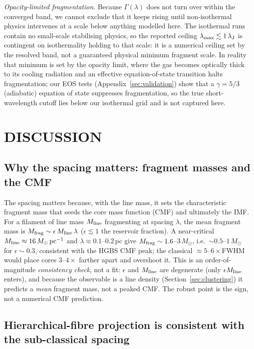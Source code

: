 \documentclass[usenatbib,twoside,twocolumn]{mnras}
\begin{document}
\emph{Opacity-limited fragmentation.} Because $\Gamma(\lambda)$ does not turn over within the converged band, we cannot exclude that it keeps rising until non-isothermal physics intervenes at a scale below anything modelled here. The isothermal runs contain no small-scale stabilising physics, so the reported ceiling $\lambda_{\rm max}\lesssim1\,\lambda_{\rm J}$ is contingent on isothermality holding to that scale: it is a numerical ceiling set by the resolved band, not a guaranteed physical minimum fragment scale. In reality that minimum is set by the opacity limit, where the gas becomes optically thick to its cooling radiation and an effective equation-of-state transition halts fragmentation; our EOS tests (Appendix~\ref{sec:validation}) show that a $\gamma=5/3$ (adiabatic) equation of state suppresses fragmentation, so the true short-wavelength cutoff lies below our isothermal grid and is not captured here.

\section{DISCUSSION}
\label{sec:discussion}

\subsection{Why the spacing matters: fragment masses and the CMF}
\label{sec:cmf}
The spacing matters because, with the line mass, it sets the characteristic fragment mass that seeds the core mass function (CMF) and ultimately the IMF. For a filament of line mass $M_{\rm line}$ fragmenting at spacing $\lambda$, the mean fragment mass is $M_{\rm frag}\sim\epsilon\,M_{\rm line}\,\lambda$ ($\epsilon\lesssim1$ the reservoir fraction). A near-critical $M_{\rm line}\approx16\,M_\odot\,{\rm pc^{-1}}$ and $\lambda\approx0.1$--$0.2$\,pc give $M_{\rm frag}\sim1.6$--$3\,M_\odot$, i.e.\ $\sim0.5$--$1\,M_\odot$ for $\epsilon\sim0.3$, consistent with the HGBS CMF peak; the classical $\approx5$--$6\times$FWHM would place cores $3$--$4\times$ farther apart and overshoot it. This is an order-of-magnitude \emph{consistency check}, not a fit: $\epsilon$ and $M_{\rm line}$ are degenerate (only $\epsilon M_{\rm line}$ enters), and because the observable is a line density (Section~\ref{sec:clustering}) it predicts a \emph{mean} fragment mass, not a peaked CMF. The robust point is the sign, not a numerical CMF prediction.


\subsection{Hierarchical-fibre projection is consistent with the sub-classical spacing}
\label{sec:fibre_projection}
\end{document}
